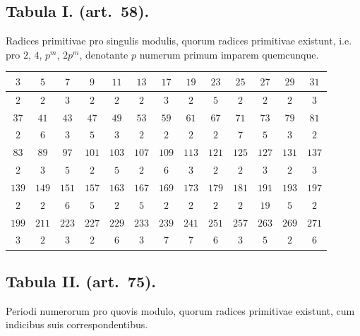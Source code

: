 \documentclass[12pt,a4paper]{article}
\theoremstyle{plain}
\theoremstyle{definition}
\theoremstyle{remark}
\begin{document}
\subsection*{Tabula I. (art.~58).}

Radices primitivae pro singulis modulis, quorum radices primitivae existunt,
i.e. pro $2$, $4$, $p^m$, $2p^m$, denotante $p$ numerum primum imparem
quemcunque.

\begin{center}
\begin{tabular}{|c|c|c|c|c|c|c|c|c|c|c|c|c|}
\hline
$3$ & $5$ & $7$ & $9$ & $11$ & $13$ & $17$ & $19$ & $23$ & $25$ & $27$ & $29$ & $31$ \\
\hline
$2$ & $2$ & $3$ & $2$ & $2$ & $2$ & $3$ & $2$ & $5$ & $2$ & $2$ & $2$ & $3$ \\
\hline
$37$ & $41$ & $43$ & $47$ & $49$ & $53$ & $59$ & $61$ & $67$ & $71$ & $73$ & $79$ & $81$ \\
\hline
$2$ & $6$ & $3$ & $5$ & $3$ & $2$ & $2$ & $2$ & $2$ & $7$ & $5$ & $3$ & $2$ \\
\hline
$83$ & $89$ & $97$ & $101$ & $103$ & $107$ & $109$ & $113$ & $121$ & $125$ & $127$ & $131$ & $137$ \\
\hline
$2$ & $3$ & $5$ & $2$ & $5$ & $2$ & $6$ & $3$ & $2$ & $2$ & $3$ & $2$ & $3$ \\
\hline
$139$ & $149$ & $151$ & $157$ & $163$ & $167$ & $169$ & $173$ & $179$ & $181$ & $191$ & $193$ & $197$ \\
\hline
$2$ & $2$ & $6$ & $5$ & $2$ & $5$ & $2$ & $2$ & $2$ & $2$ & $19$ & $5$ & $2$ \\
\hline
$199$ & $211$ & $223$ & $227$ & $229$ & $233$ & $239$ & $241$ & $251$ & $257$ & $263$ & $269$ & $271$ \\
\hline
$3$ & $2$ & $3$ & $2$ & $6$ & $3$ & $7$ & $7$ & $6$ & $3$ & $5$ & $2$ & $6$ \\
\hline
\end{tabular}
\end{center}

\subsection*{Tabula II. (art.~75).}

Periodi numerorum pro quovis modulo, quorum radices primitivae existunt,
cum indicibus suis correspondentibus.

\smallskip
\end{document}
